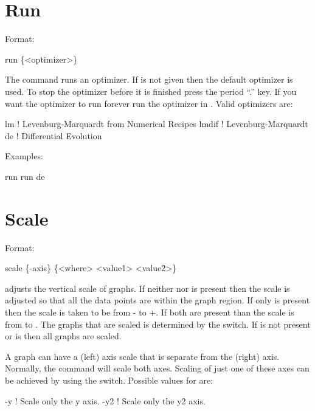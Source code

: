 \section{Run}
\label{s:run}

Format:
\begin{example}
  run \{<optimizer>\}
\end{example}

\vskip 0.2in The  command runs an optimizer. If
 is not given then the default optimizer is used. To
stop the optimizer before it is finished press the period ``.''
key. If you want the optimizer to run forever run the optimizer in
. Valid optimizers are:
\begin{example}
  lm            ! Levenburg-Marquardt from Numerical Recipes 
  lmdif         ! Levenburg-Marquardt 
  de            ! Differential Evolution
\end{example}

Examples:
\begin{example}
  run 
  run de
\end{example}

\section{Scale}
\label{s:scale}

Format:
\begin{example}
  scale \{-axis\} \{<where> <value1> <value2>\}
\end{example}

\vskip 0.2in 
 adjusts the vertical scale of graphs. If neither
 nor  is present then the scale is adjusted
so that all the data points are within the graph region.  If only
 is present then the scale is taken to be from
- to +. If both are present than the scale
is from  to .  The graphs that are scaled is
determined by the  switch. If  is not present
or  is  then all graphs are scaled.

A graph can have a  (left) axis scale that is separate from the  (right) 
axis. Normally, the  command will scale both axes.  Scaling of just one of these
axes can be achieved by using the  switch. Possible values for  are:
\begin{example}
  -y                 ! Scale only the y axis.
  -y2                ! Scale only the y2 axis.
\end{example}


